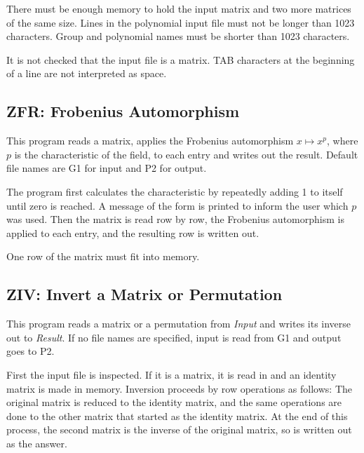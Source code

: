 \Limits
There must be enough memory to hold the input matrix and two
more matrices of the same size.
Lines in the polynomial input file must not be longer than 1023
characters. Group and polynomial names must be shorter than 1023
characters.


\Bugs
It is not checked that the input file is a matrix.
TAB characters at the beginning of a line are not interpreted
as space.



\subsection{ZFR: Frobenius Automorphism}
\Syntax
{}

\Description
This program reads a matrix, applies
the Frobenius automorphism $x\mapsto x^p$, where $p$ is the
characteristic of the field, to each entry and writes out the
result. Default file names are G1 for input and P2 for output.

The program first calculates the characteristic by repeatedly
adding 1 to itself until zero is reached. A message of the form
is printed to inform the user which $p$ was used. Then the matrix
is read row by row, the Frobenius automorphism is applied to
each entry, and the resulting row is written out.

\Limits
One row of the matrix must fit into memory.



\subsection{ZIV: Invert a Matrix or Permutation}
\Syntax
{}

\Description
This program reads a matrix or a permutation from {\it Input}
and writes its inverse out to {\it Result}. If no file names
are specified, input is read from G1 and output goes to P2.

First the input file is inspected. If it is a matrix, it
is read in and an identity matrix is made
in memory. Inversion proceeds by row operations as follows: The
original matrix is reduced to the identity matrix, and the same
operations are done to the other matrix that started as the identity
matrix. At the end of this process, the second matrix is the inverse
of the original matrix, so is written out as the answer.

